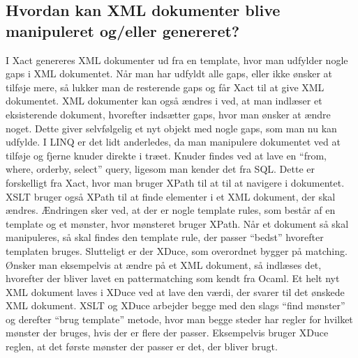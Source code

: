 \documentclass[a4paper,10pt]{article}
\begin{document}
\subsection{Hvordan kan XML dokumenter blive manipuleret og/eller genereret?}
I Xact genereres XML dokumenter ud fra en template, hvor man udfylder nogle gaps i XML dokumentet. Når man har udfyldt alle gaps, eller ikke ønsker at tilføje mere, så lukker man de resterende gaps og får Xact til at give XML dokumentet. XML dokumenter kan også ændres i ved, at man indlæser et eksisterende dokument, hvorefter indsætter gaps, hvor man ønsker at ændre noget. Dette giver selvfølgelig et nyt objekt med nogle gaps, som man nu kan udfylde. I LINQ er det lidt anderledes, da man manipulere dokumentet ved at tilføje og fjerne knuder direkte i træet. Knuder findes ved at lave en ``from, where, orderby, select'' query, ligesom man kender det fra SQL. Dette er forskelligt fra Xact, hvor man bruger XPath til at til at navigere i dokumentet. XSLT bruger også XPath til at finde elementer i et XML dokument, der skal ændres. Ændringen sker ved, at der er nogle template rules, som består af en template og et mønster, hvor mønsteret bruger XPath. Når et dokument så skal manipuleres, så skal findes den template rule, der passer ``bedst'' hvorefter templaten bruges. Slutteligt er der XDuce, som overordnet bygger på matching. Ønsker man eksempelvis at ændre på et XML dokument, så indlæses det, hvorefter der bliver lavet en pattermatching som kendt fra Ocaml. Et helt nyt XML dokument laves i XDuce ved at lave den værdi, der svarer til det ønskede XML dokument. XSLT og XDuce arbejder begge med den slags ``find mønster'' og derefter ``brug template'' metode, hvor man begge steder har regler for hvilket mønster der bruges, hvis der er flere der passer. Eksempelvis bruger XDuce reglen, at det første mønster der passer er det, der bliver brugt.
\end{document}

